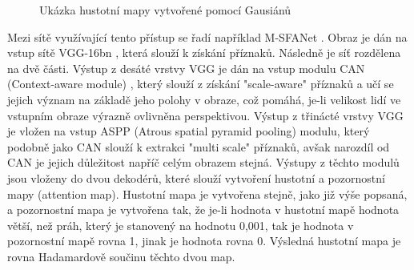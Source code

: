\begin{description}
\begin{figure}[h!]
	\centering
	\caption{Ukázka hustotní mapy vytvořené pomocí Gausiánů}
\end{figure}

Mezi sítě využívající tento přístup se řadí například M-SFANet \cite{MSFANet_for_crowd_counting}.
Obraz je dán na vstup sítě VGG-16bn \cite{VGG}, která slouží k získání příznaků.
Následně je síť rozdělena na dvě části.
Výstup z desáté vrstvy VGG je dán na vstup modulu CAN (Context-aware module) \cite{CAN_1, CAN_2}, který slouží z získání "scale-aware" příznaků a učí se jejich význam na základě jeho polohy v obraze, což pomáhá, je-li velikost lidí ve vstupním obraze výrazně ovlivněna perspektivou.
Výstup z třinácté vrstvy VGG je vložen na vstup ASPP \cite{ASPP} (Atrous spatial pyramid pooling) modulu, který podobně jako CAN slouží k extrakci "multi scale" příznaků, avšak narozdíl od CAN je jejich důležitost napříč celým obrazem stejná.
Výstupy z těchto modulů jsou vloženy do dvou dekodérů, které slouží vytvoření hustotní a pozornostní mapy (attention map).
Hustotní mapa je vytvořena stejně, jako již výše popsaná, a pozornostní mapa je vytvořena tak, že je-li hodnota v hustotní mapě hodnota větší, než práh, který je stanovený na hodnotu 0,001, tak je hodnota v pozornostní mapě rovna 1, jinak je hodnota rovna 0.
Výsledná hustotní mapa je rovna Hadamardově součinu těchto dvou map.


\end{description}
